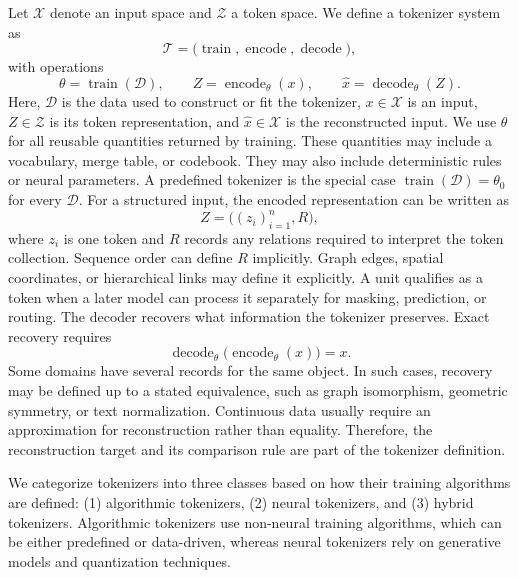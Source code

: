 Let $\mathcal{X}$ denote an input space and $\mathcal{Z}$ a token space. We define a tokenizer system as
\begin{equation}
\mathcal{T}
=\bigl(\operatorname{train},\operatorname{encode},\operatorname{decode}\bigr),
\label{eq:tokenizer-triple}
\end{equation}
with operations
\begin{equation}
\theta=\operatorname{train}(\mathcal{D}),
\qquad
Z=\operatorname{encode}_{\theta}(x),
\qquad
\widehat{x}=\operatorname{decode}_{\theta}(Z).
\label{eq:tokenizer-system}
\end{equation}
Here, $\mathcal{D}$ is the data used to construct or fit the tokenizer, $x\in\mathcal{X}$ is an input, $Z\in\mathcal{Z}$ is its token representation, and $\widehat{x}\in\mathcal{X}$ is the reconstructed input. We use $\theta$ for all reusable quantities returned by training. These quantities may include a vocabulary, merge table, or codebook. They may also include deterministic rules or neural parameters. A predefined tokenizer is the special case $\operatorname{train}(\mathcal{D})=\theta_0$ for every $\mathcal{D}$.
For a structured input, the encoded representation can be written as
\begin{equation}
Z=\bigl((z_i)_{i=1}^{n},R\bigr),
\label{eq:structured-tokens}
\end{equation}
where $z_i$ is one token and $R$ records any relations required to interpret the token collection. Sequence order can define $R$ implicitly. Graph edges, spatial coordinates, or hierarchical links may define it explicitly. A unit qualifies as a token when a later model can process it separately for masking, prediction, or routing. The decoder recovers what information the tokenizer preserves. Exact recovery requires
\begin{equation}
\operatorname{decode}_{\theta}
\bigl(\operatorname{encode}_{\theta}(x)\bigr)=x.
\label{eq:exact-roundtrip}
\end{equation}
Some domains have several records for the same object. In such cases, recovery may be defined up to a stated equivalence, such as graph isomorphism, geometric symmetry, or text normalization. Continuous data usually require an approximation for reconstruction rather than equality. Therefore, the reconstruction target and its comparison rule are part of the tokenizer definition.

We categorize tokenizers into three classes based on how their training algorithms are defined: (1) algorithmic tokenizers, (2) neural tokenizers, and (3) hybrid tokenizers. Algorithmic tokenizers use non-neural training algorithms, which can be either predefined or data-driven, whereas neural tokenizers rely on generative models and quantization techniques.

